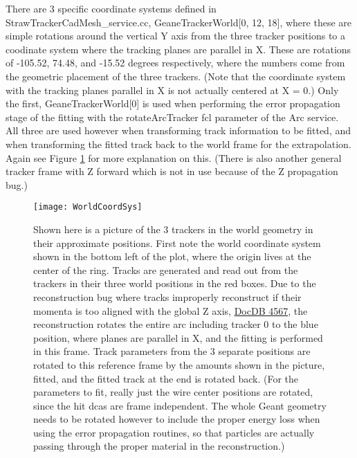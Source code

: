 	There are 3 specific coordinate systems defined in StrawTrackerCadMesh\_service.cc, GeaneTrackerWorld[0, 12, 18], where these are simple rotations around the vertical Y axis from the three tracker positions to a coodinate system where the tracking planes are parallel in X. These are rotations of -105.52, 74.48, and -15.52 degrees respectively, where the numbers come from the geometric placement of the three trackers. (Note that the coordinate system with the tracking planes parallel in X is not actually centered at X = 0.) Only the first, GeaneTrackerWorld[0] is used when performing the error propagation stage of the fitting with the rotateArcTracker fcl parameter of the Arc service. All three are used however when transforming track information to be fitted, and when transforming the fitted track back to the world frame for the extrapolation. Again see Figure \ref{fig:WorldCoordSys} for more explanation on this. (There is also another general tracker frame with Z forward which is not in use because of the Z propagation bug.) 

	\begin{figure}[]
		\caption{Shown here is a picture of the 3 trackers in the world geometry in their approximate positions. First note the world coordinate system shown in the bottom left of the plot, where the origin lives at the center of the ring. Tracks are generated and read out from the trackers in their three world positions in the red boxes. Due to the reconstruction bug where tracks improperly reconstruct if their momenta is too aligned with the global Z axis, \href{http://gm2-docdb.fnal.gov:8080/cgi-bin/ShowDocument?docid=4567}{DocDB 4567}, the reconstruction rotates the entire arc including tracker 0 to the blue position, where planes are parallel in X, and the fitting is performed in this frame. Track parameters from the 3 separate positions are rotated to this reference frame by the amounts shown in the picture, fitted, and the fitted track at the end is rotated back. (For the parameters to fit, really just the wire center positions are rotated, since the hit dcas are frame independent. The whole Geant geometry needs to be rotated however to include the proper energy loss when using the error propagation routines, so that particles are actually passing through the proper material in the reconstruction.)}
	\centering
	\texttt{[image: WorldCoordSys]}
	\label{fig:WorldCoordSys}
	\end{figure}


